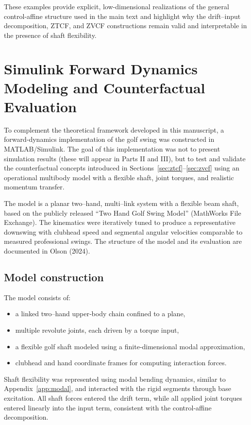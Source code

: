 \documentclass[12pt]{article}
\begin{document}
These examples provide explicit, low-dimensional realizations of the general control-affine structure used in the main text and highlight why the drift--input decomposition, ZTCF, and ZVCF constructions remain valid and interpretable in the presence of shaft flexibility.
\section{Simulink Forward Dynamics Modeling and Counterfactual Evaluation}
\label{sec:simulink}

To complement the theoretical framework developed in this manuscript, a forward‐dynamics implementation of the golf swing was constructed in MATLAB/Simulink. The goal of this implementation was not to present simulation results (these will appear in Parts II and III), but to test and validate the counterfactual concepts introduced in Sections~\ref{sec:ztcf}–\ref{sec:zvcf} using an operational multibody model with a flexible shaft, joint torques, and realistic momentum transfer.

The model is a planar two–hand, multi–link system with a flexible beam shaft, based on the publicly released “Two Hand Golf Swing Model” (MathWorks File Exchange). The kinematics were iteratively tuned to produce a representative downswing with clubhead speed and segmental angular velocities comparable to measured professional swings. The structure of the model and its evaluation are documented in Olson (2024). 

\subsection{Model construction}

The model consists of:
\begin{itemize}
  \item a linked two–hand upper‐body chain confined to a plane,
  \item multiple revolute joints, each driven by a torque input,
  \item a flexible golf shaft modeled using a finite‐dimensional modal approximation,
  \item clubhead and hand coordinate frames for computing interaction forces.
\end{itemize}

Shaft flexibility was represented using modal bending dynamics, similar to Appendix~\ref{app:modal}, and interacted with the rigid segments through base excitation. All shaft forces entered the drift term, while all applied joint torques entered linearly into the input term, consistent with the control‐affine decomposition.
\end{document}
